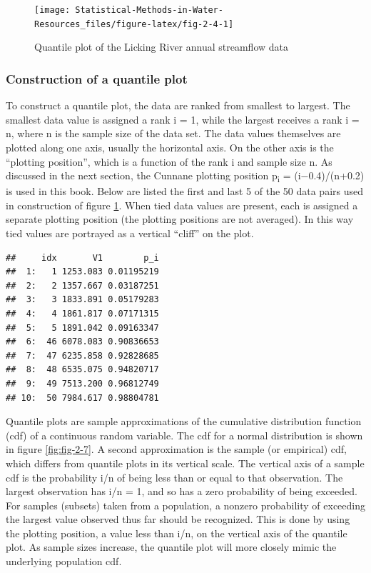 \documentclass[]{book}
\begin{document}
\begin{figure}

{\centering \texttt{[image: Statistical-Methods-in-Water-Resources\_files/figure-latex/fig-2-4-1]} 

}

\caption{Quantile plot of the Licking River annual streamflow data}\label{fig:fig-2-4}
\end{figure}

\hypertarget{construction-of-a-quantile-plot}{%
\subsubsection{Construction of a quantile plot}\label{construction-of-a-quantile-plot}}

To construct a quantile plot, the data are ranked from smallest to largest. The smallest data value is assigned a rank i = 1, while the largest receives a rank i = n, where n is the sample size of the data set. The data values themselves are plotted along one axis, usually the horizontal axis. On the other axis is the ``plotting position'', which is a function of the rank i and sample size n. As discussed in the next section, the Cunnane plotting position p\textsubscript{i} = (i−0.4)/(n+0.2) is used in this book. Below are listed the first and last 5 of the 50 data pairs used in construction of figure \ref{fig:fig-2-4}. When tied data values are present, each is assigned a separate plotting position (the plotting positions are not averaged). In this way tied values are portrayed as a vertical ``cliff'' on the plot.

\begin{verbatim}
##     idx       V1        p_i
##  1:   1 1253.083 0.01195219
##  2:   2 1357.667 0.03187251
##  3:   3 1833.891 0.05179283
##  4:   4 1861.817 0.07171315
##  5:   5 1891.042 0.09163347
##  6:  46 6078.083 0.90836653
##  7:  47 6235.858 0.92828685
##  8:  48 6535.075 0.94820717
##  9:  49 7513.200 0.96812749
## 10:  50 7984.617 0.98804781
\end{verbatim}

Quantile plots are sample approximations of the cumulative distribution function (cdf) of a continuous random variable. The cdf for a normal distribution is shown in figure \ref{fig:fig-2-7}. A second approximation is the sample (or empirical) cdf, which differs from quantile plots in its vertical scale. The vertical axis of a sample cdf is the probability i/n of being less than or equal to that observation. The largest observation has i/n = 1, and so has a zero probability of being exceeded. For samples (subsets) taken from a population, a nonzero probability of exceeding the largest value observed thus far should be recognized. This is done by using the plotting position, a value less than i/n, on the vertical axis of the quantile plot. As sample sizes increase, the quantile plot will more closely mimic the underlying population cdf.
\end{document}
